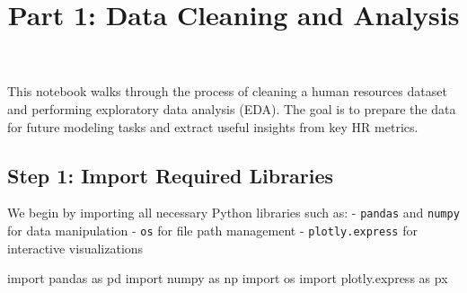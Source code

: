 \documentclass[
  letterpaper,
  DIV=11,
  numbers=noendperiod]{scrartcl}
\title{Part 1: Data Cleaning and Analysis}
\author{}
\date{}
\newenvironment{Shaded}{\begin{snugshade}}{\end{snugshade}}
\newcommand{\ImportTok}[1]{\textcolor[rgb]{0.00,0.46,0.62}{#1}}
\newcommand{\NormalTok}[1]{\textcolor[rgb]{0.00,0.23,0.31}{#1}}
\begin{document}
\maketitle


This notebook walks through the process of cleaning a human resources
dataset and performing exploratory data analysis (EDA). The goal is to
prepare the data for future modeling tasks and extract useful insights
from key HR metrics.

\subsection{Step 1: Import Required
Libraries}\label{step-1-import-required-libraries}

We begin by importing all necessary Python libraries such as: -
\texttt{pandas} and \texttt{numpy} for data manipulation - \texttt{os}
for file path management - \texttt{plotly.express} for interactive
visualizations

\begin{Shaded}
\begin{Highlighting}[]
\ImportTok{import}\NormalTok{ pandas }\ImportTok{as}\NormalTok{ pd}
\ImportTok{import}\NormalTok{ numpy }\ImportTok{as}\NormalTok{ np }
\ImportTok{import}\NormalTok{ os}
\ImportTok{import}\NormalTok{ plotly.express }\ImportTok{as}\NormalTok{ px}
\end{Highlighting}
\end{Shaded}
\end{document}
